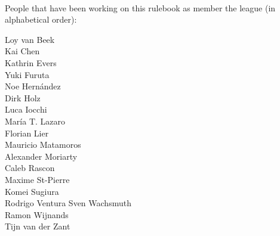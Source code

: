 ~\\\noindent People that have been working on this rulebook as member the league (in alphabetical order):
\begin{multicols}{2}%
\noindent%
Loy van Beek\\
Kai Chen\\
Kathrin Evers\\
Yuki Furuta\\
Noe Hern{\'a}ndez\\
Dirk Holz\\
Luca Iocchi\\
Mar{\'i}a T. Lazaro\\
Florian Lier\\
Mauricio Matamoros\\
Alexander Moriarty\\
Caleb Rascon\\
Maxime St-Pierre\\
Komei Sugiura\\
Rodrigo Ventura
Sven Wachsmuth\\
Ramon Wijnands\\
Tijn van der Zant\\
\end{multicols}




